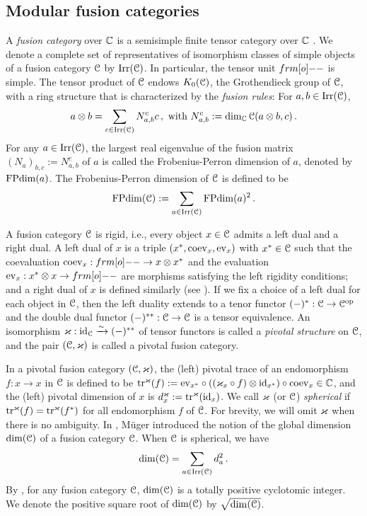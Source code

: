 \documentclass[11pt]{article}
\begin{document}
\subsection{Modular fusion categories}
\label{subsec:mtc} 
A \emph{fusion category} over ${\mathbb{C}}$ is a semisimple finite tensor category over ${\mathbb{C}}$ \cite{ENO05}. We denote a complete set of representatives of isomorphism classes of simple objects of a fusion category ${\mathcal{C}}$ by ${\operatorname{Irr}}({\mathcal{C}})$. In particular, the tensor unit $\1$ is simple. The tensor product of $\mathcal{C}$ endows $K_0({\mathcal{C}})$, the Grothendieck group of ${\mathcal{C}}$, with a ring structure that is characterized by the \emph{fusion rules}: For $a, b\in{\operatorname{Irr}}({\mathcal{C}})$,
\begin{equation}\label{eq:fusion-rules}
a\otimes b = \sum_{c\in{\operatorname{Irr}}({\mathcal{C}})} N_{a, b}^{c} c\,, \text{ with } N_{a, b}^{c} := \dim_{\mathbb{C}}{\mathcal{C}}(a\otimes b, c)\,.
\end{equation}
For any $a \in {\operatorname{Irr}}(\mathcal{C})$, the largest real eigenvalue of the fusion matrix $(N_a)_{b, c} := N_{a,b}^{c}$ of $a$ is called the Frobenius-Perron dimension of $a$, denoted by $\operatorname{FPdim}(a)$. The Frobenius-Perron dimension of $\mathcal{C}$ is defined to be 
\begin{equation}
    \operatorname{FPdim}(\mathcal{C}) := \sum_{a \in {\operatorname{Irr}}(\mathcal{C})} \operatorname{FPdim}(a)^2\,.
\end{equation}

A fusion category ${\mathcal{C}}$ is rigid,  i.e., every object $x \in \mathcal{C}$ admits a left dual and a right dual. A left dual of $x$ is a triple $(x^*, {\operatorname{coev}}_x, {\operatorname{ev}}_x)$ with $x^*\in {\mathcal{C}}$ such that the coevaluation $\coev_{x}: \1 \to x \otimes x^{*}$ and the evaluation $\ev_{x}: x^* \otimes x \to \1$ are morphisms satisfying the left rigidity conditions; and a right dual of $x$ is defined similarly (see \cite[Sec.~2.10]{EGNO}). If we fix a choice of a left dual for each object in $\mathcal{C}$, then the left duality extends to a tenor functor $(-)^* : {\mathcal{C}} \rightarrow {\mathcal{C}}^{{\operatorname{op}}}$ and the double dual functor $(-)^{**}: \mathcal{C} \rightarrow \mathcal{C}$ is a tensor equivalence. An isomorphism $\varkappa: {\operatorname{id}}_{\mathcal{C}} \xrightarrow{\sim} (-)^{**}$ of tensor functors is called a \emph{pivotal structure} on $\mathcal{C}$, and the pair $(\mathcal{C}, \varkappa)$ is called a pivotal fusion category. 

In a pivotal fusion category $(\mathcal{C}, \varkappa)$, the (left) pivotal trace of an endomorphism $f: x \to x$ in $\mathcal{C}$ is defined to be ${\operatorname{tr}}^{\varkappa}(f) := {\operatorname{ev}}_{x^{*}} \circ ((\varkappa_x\circ f) \otimes {\operatorname{id}}_{x^{*}}) \circ {\operatorname{coev}}_x \in \mathbb{C}$, and the (left) pivotal dimension of $x$ is $d^{\varkappa}_x := {\operatorname{tr}}^{\varkappa}({\operatorname{id}}_x)$. We call $\varkappa$ (or $\mathcal{C}$) \emph{spherical} if ${\operatorname{tr}}^{\varkappa}(f) = {\operatorname{tr}}^{\varkappa}(f^*)$ for all endomorphism $f$ of ${\mathcal{C}}$. For brevity,  we will omit $\varkappa$ when there is  no ambiguity. 
In \cite{Mug031}, M\"uger introduced the notion of the global dimension $\dim(\mathcal{C})$ of a fusion category $\mathcal{C}$.
When $\mathcal{C}$ is spherical, we have
\begin{equation}
\dim({\mathcal{C}}) = \sum_{a \in {\operatorname{Irr}}({\mathcal{C}})} d_a^2\,.
\end{equation}
By \cite[Rmk.\ 2.5]{ENO05}, for any fusion category $\mathcal{C}$, $\dim({\mathcal{C}})$ is a totally positive cyclotomic integer. We denote the positive square root of $\dim({\mathcal{C}})$ by $\sqrt{\dim({\mathcal{C}})}$. 
\end{document}
